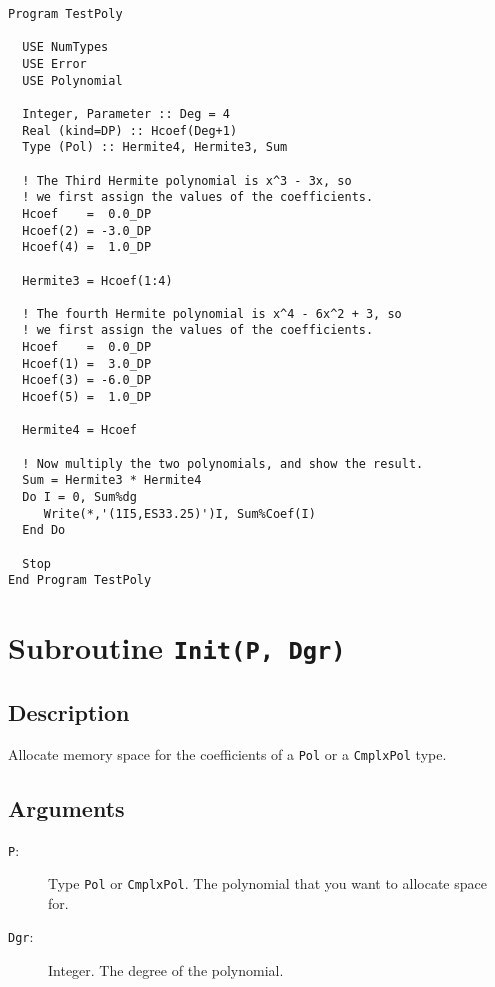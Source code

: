 \begin{lstlisting}[emph=Type,
                   emphstyle=\color{blue},
                   frame=trBL,
                   caption=Computing the product of two polynomials.,
                   label=prodpol]
Program TestPoly

  USE NumTypes
  USE Error
  USE Polynomial

  Integer, Parameter :: Deg = 4
  Real (kind=DP) :: Hcoef(Deg+1)
  Type (Pol) :: Hermite4, Hermite3, Sum

  ! The Third Hermite polynomial is x^3 - 3x, so
  ! we first assign the values of the coefficients.
  Hcoef    =  0.0_DP
  Hcoef(2) = -3.0_DP
  Hcoef(4) =  1.0_DP

  Hermite3 = Hcoef(1:4)

  ! The fourth Hermite polynomial is x^4 - 6x^2 + 3, so
  ! we first assign the values of the coefficients.
  Hcoef    =  0.0_DP
  Hcoef(1) =  3.0_DP
  Hcoef(3) = -6.0_DP
  Hcoef(5) =  1.0_DP

  Hermite4 = Hcoef

  ! Now multiply the two polynomials, and show the result.
  Sum = Hermite3 * Hermite4
  Do I = 0, Sum%dg
     Write(*,'(1I5,ES33.25)')I, Sum%Coef(I)
  End Do

  Stop
End Program TestPoly
\end{lstlisting}


\section{Subroutine \texttt{Init(P, Dgr)}}

\subsection{Description}

Allocate memory space for the coefficients of a \texttt{Pol} or a
\texttt{CmplxPol} type. 

\subsection{Arguments}

\begin{description}
\item[\texttt{P}:] Type \texttt{Pol} or \texttt{CmplxPol}. The
  polynomial that you want to allocate space for.
\item[\texttt{Dgr}:] Integer. The degree of the polynomial.
\end{description}

